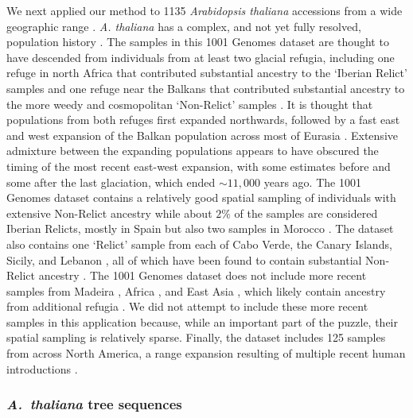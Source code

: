 \documentclass[12pt]{article}
\begin{document}
We next applied our method to 1135 \textit{Arabidopsis thaliana} accessions from a wide geographic range \citep{alonso2016}.
\textit{A. thaliana} has a complex, and not yet fully resolved, population history \citep{fulgione2018archaic,hsu2019postglacial}.
The samples in this 1001 Genomes dataset are thought to have descended from individuals from at least two glacial refugia, including one refuge in north Africa that contributed substantial ancestry to the `Iberian Relict' samples \citep{alonso2016,durvasula2017african,fulgione2018madeiran} and one refuge near the Balkans that contributed substantial ancestry to the more weedy and cosmopolitan `Non-Relict' samples \citep{lee2017post}.
It is thought that populations from both refuges first expanded northwards, followed by a fast east and west expansion of the Balkan population across most of Eurasia  \citep{alonso2016,lee2017post,fulgione2018archaic,hsu2019postglacial}.   
Extensive admixture between the expanding populations appears to have obscured the timing of the most recent east-west expansion, with some estimates before \citep{durvasula2017african,fulgione2018madeiran} and some after \citep{alonso2016,lee2017post,hsu2019postglacial} the last glaciation, which ended $\sim11,000$ years ago.
The 1001 Genomes dataset contains a relatively good spatial sampling of individuals with extensive Non-Relict ancestry while about $2\%$ of the samples are considered Iberian Relicts, mostly in Spain but also two samples in Morocco \citep{alonso2016}.
The dataset also contains one `Relict' sample from each of Cabo Verde, the Canary Islands, Sicily, and Lebanon \citep{alonso2016}, all of which have been found to contain substantial Non-Relict ancestry \citep{alonso2016,lee2017post,zeng2017discovery}.
The 1001 Genomes dataset does not include more recent samples from Madeira \citep{fulgione2018madeiran}, Africa \citep{durvasula2017african}, and East Asia \citep{zeng2017discovery,zou2017adaptation}, which likely contain ancestry from additional refugia \citep{fulgione2018archaic,hsu2019postglacial}. 
We did not attempt to include these more recent samples in this application because, while an important part of the puzzle, their spatial sampling is relatively sparse.
Finally, the dataset includes 125 samples from across North America, a range expansion resulting of multiple recent human introductions \citep{exposito2018rate,shirsekar2021fine}.

\subsubsection*{\textit{A.\ thaliana} tree sequences}
\end{document}
